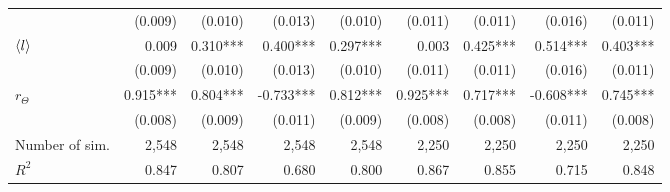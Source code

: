 \begin{table}
{\begin{tabular}{lrrrrrrrr}
                   &                  (0.009) &                  (0.010) &                  (0.013) &                  (0.010)   &   (0.011) &                  (0.011) &                  (0.016) &                  (0.011)\\ 
    $\langle l \rangle$           &                    0.009 &                 0.310*** &                 0.400*** &                 0.297***   &     0.003 &                 0.425*** &                 0.514*** &                 0.403***\\ 
                   &                  (0.009) &                  (0.010) &                  (0.013) &                  (0.010)   &   (0.011) &                  (0.011) &                  (0.016) &                  (0.011)\\ 
    $r_\Theta$     &                 0.915*** &                 0.804*** &                -0.733*** &                 0.812***   &  0.925*** &                 0.717*** &                -0.608*** &                 0.745***\\ 
                   &                  (0.008) &                  (0.009) &                  (0.011) &                  (0.009)   &   (0.008) &                  (0.008) &                  (0.011) &                  (0.008)\\ 
    \midrule                                                                                                                                                                                                                                    
    Number of sim. &                    2,548 &                    2,548 &                    2,548 &                    2,548   &     2,250 &                    2,250 &                    2,250 &                    2,250\\ 
    $R^2$          &                    0.847 &                    0.807 &                    0.680 &                    0.800   &     0.867 &                    0.855 &                    0.715 &                    0.848\\ 
    \bottomrule
    \end{tabular}
    }
    \label{table:coefficients_set2}
\end{table}
\FloatBarrier

